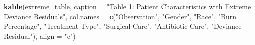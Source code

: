 \documentclass[12pt]{article}
\newenvironment{Shaded}{\begin{snugshade}}{\end{snugshade}}
\newcommand{\AttributeTok}[1]{\textcolor[rgb]{0.13,0.29,0.53}{#1}}
\newcommand{\FunctionTok}[1]{\textcolor[rgb]{0.13,0.29,0.53}{\textbf{#1}}}
\newcommand{\NormalTok}[1]{#1}
\newcommand{\StringTok}[1]{\textcolor[rgb]{0.31,0.60,0.02}{#1}}
\begin{document}
\begin{Shaded}
\begin{Highlighting}[]
\FunctionTok{kable}\NormalTok{(extreme\_table, }
      \AttributeTok{caption =} \StringTok{"Table 1: Patient Characteristics with Extreme Deviance Residuals"}\NormalTok{,}
      \AttributeTok{col.names =} \FunctionTok{c}\NormalTok{(}\StringTok{"Observation"}\NormalTok{, }\StringTok{"Gender"}\NormalTok{, }\StringTok{"Race"}\NormalTok{, }\StringTok{"Burn Percentage"}\NormalTok{, }
                    \StringTok{"Treatment Type"}\NormalTok{, }\StringTok{"Surgical Care"}\NormalTok{, }\StringTok{"Antibiotic Care"}\NormalTok{, }\StringTok{"Deviance Residual"}\NormalTok{),}
      \AttributeTok{align =} \StringTok{"c"}\NormalTok{)}
\end{Highlighting}
\end{Shaded}




\end{document}
